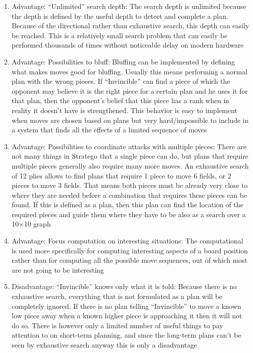 \documentclass{article}
\begin{document}
\begin{enumerate}
  \item Advantage: “Unlimited” search depth: The search depth is unlimited because the depth is defined by the useful depth to detect and complete a plan. 
  Because of the directional rather than exhaustive search, this depth can easily be reached. 
  This is a relatively small search problem that can easily be performed thousands of times without noticeable delay on modern hardware 
  \item Advantage: Possibilities to bluff: Bluffing can be implemented by defining what makes moves good for bluffing. Usually this means performing a normal plan with the wrong pieces. 
  If “Invincible” can find a piece of which the opponent may believe it is the right piece for a certain plan and he uses it for that plan, then the opponent's belief that this piece has a rank when in reality it doesn’t have is strengthened. 
  This behavior is easy to implement when moves are chosen based on plans but very hard/impossible to include in a system that finds all the effects of a limited sequence of moves
  \item Advantage: Possibilities to coordinate attacks with multiple pieces: 
  There are not many things in Stratego that a single piece can do, but plans that require multiple pieces generally also require many more moves. 
  An exhaustive search of 12 plies allows to find plans that require 1 piece to move 6 fields, or 2 pieces to move 3 fields. 
  That means both pieces must be already very close to where they are needed before a combination that requires these pieces can be found. 
  If this is defined as a plan, then this plan can find the location of the required pieces and guide them where they have to be also as a search over a 10$\times$10 graph
  \item Advantage: Focus computation on interesting situations: 
  The computational is used more specifically for computing interesting aspects of a board position rather than for computing all the possible move sequences, out of which most are not going to be interesting 
  \item Disadvantage: “Invincible” knows only what it is told: Because there is no exhaustive search, everything that is not formulated as a plan will be completely ignored. 
  If there is no plan telling “Invincible” to move a known low piece away when a known higher piece is approaching it then it will not do so. 
  There is however only a limited number of useful things to pay attention to on short-term planning, and since the long-term plans can’t be seen by exhaustive search anyway this is only a disadvantage 

\end{enumerate}
\end{document}
